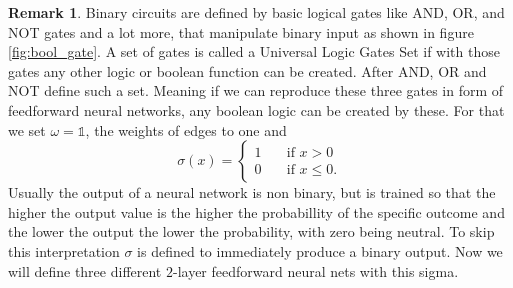 \documentclass{article}
\theoremstyle{definition}
\newtheorem{remark}[theorem]{Remark}
\begin{document}
\begin{remark}
Binary circuits are defined by basic logical gates like AND, OR, and NOT gates and a lot more, that manipulate binary input as shown in figure \ref{fig:bool_gate}. A set of gates is called a Universal Logic Gates Set if with those gates any other logic or boolean function can be created. After \cite{quine1955way} AND, OR and NOT define such a set. Meaning if we can reproduce these three gates in form of feedforward neural networks, any boolean logic can be created by these. For that we set $\omega=\mathds{1}$, the weights of edges to one and
\[ \sigma(x) = 
  \begin{cases}
    1       & \quad \text{if } x > 0\\
    0  		& \quad \text{if } x \leq 0.
  \end{cases}
\]
Usually the output of a neural network is non binary, but is trained so that the higher the output value is the higher the probabillity of the specific outcome and the lower the output the lower the probability, with zero being neutral. To skip this interpretation $\sigma$ is defined to immediately produce a binary output. Now we will define three different $2$-layer feedforward neural nets with this sigma.



\end{remark}
\end{document}
